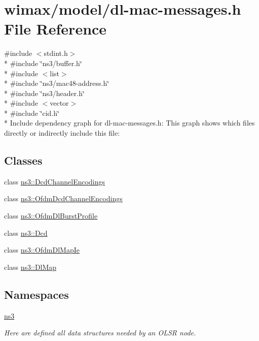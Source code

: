 \hypertarget{dl-mac-messages_8h}{}\section{wimax/model/dl-\/mac-\/messages.h File Reference}
\label{dl-mac-messages_8h}
{\ttfamily \#include $<$stdint.\+h$>$}\\*
{\ttfamily \#include \char`\"{}ns3/buffer.\+h\char`\"{}}\\*
{\ttfamily \#include $<$list$>$}\\*
{\ttfamily \#include \char`\"{}ns3/mac48-\/address.\+h\char`\"{}}\\*
{\ttfamily \#include \char`\"{}ns3/header.\+h\char`\"{}}\\*
{\ttfamily \#include $<$vector$>$}\\*
{\ttfamily \#include \char`\"{}cid.\+h\char`\"{}}\\*
Include dependency graph for dl-\/mac-\/messages.h\+:
This graph shows which files directly or indirectly include this file\+:
\subsection*{Classes}
\begin{DoxyCompactItemize}
\item 
class \hyperlink{classns3_1_1DcdChannelEncodings}{ns3\+::\+Dcd\+Channel\+Encodings}
\item 
class \hyperlink{classns3_1_1OfdmDcdChannelEncodings}{ns3\+::\+Ofdm\+Dcd\+Channel\+Encodings}
\item 
class \hyperlink{classns3_1_1OfdmDlBurstProfile}{ns3\+::\+Ofdm\+Dl\+Burst\+Profile}
\item 
class \hyperlink{classns3_1_1Dcd}{ns3\+::\+Dcd}
\item 
class \hyperlink{classns3_1_1OfdmDlMapIe}{ns3\+::\+Ofdm\+Dl\+Map\+Ie}
\item 
class \hyperlink{classns3_1_1DlMap}{ns3\+::\+Dl\+Map}
\end{DoxyCompactItemize}
\subsection*{Namespaces}
\begin{DoxyCompactItemize}
\item 
 \hyperlink{namespacens3}{ns3}
\begin{DoxyCompactList}\small\item\em Here are defined all data structures needed by an O\+L\+SR node. \end{DoxyCompactList}\end{DoxyCompactItemize}
